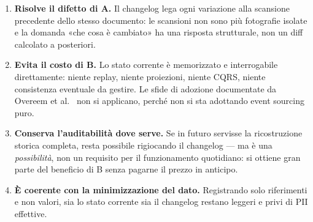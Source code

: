 \begin{enumerate}
	\item \textbf{Risolve il difetto di A.} Il changelog lega ogni variazione alla scansione precedente dello stesso documento: le scansioni non sono più fotografie isolate e la domanda «che cosa è cambiato» ha una risposta strutturale, non un diff calcolato a posteriori.
	\item \textbf{Evita il costo di B.} Lo stato corrente è memorizzato e interrogabile direttamente: niente replay, niente proiezioni, niente CQRS, niente consistenza eventuale da gestire. Le sfide di adozione documentate da Overeem et al.~\cite{overeemEmpiricalCharacterizationEvent2021} non si applicano, perché non si sta adottando event sourcing puro.
	\item \textbf{Conserva l'auditabilità dove serve.} Se in futuro servisse la ricostruzione storica completa, resta possibile rigiocando il changelog --- ma è una \textit{possibilità}, non un requisito per il funzionamento quotidiano: si ottiene gran parte del beneficio di B senza pagarne il prezzo in anticipo.
	\item \textbf{È coerente con la minimizzazione del dato.} Registrando solo riferimenti e non valori, sia lo stato corrente sia il changelog restano leggeri e privi di PII effettive.
\end{enumerate}


